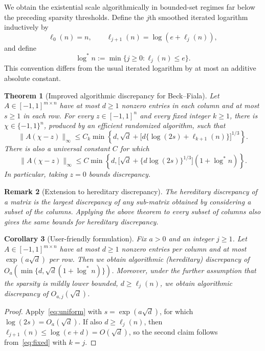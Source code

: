 \documentclass[reqno]{amsart}
\newtheorem{theorem}{Theorem}[section]
\newtheorem{corollary}[theorem]{Corollary}
\newtheorem{remark}[theorem]{Remark}
\theoremstyle{definition}
\newcommand{\norm}[1]{\lVert#1\rVert}
\newcommand{\lstar}{\log^*}
\begin{document}
We obtain the existential scale algorithmically in bounded-set regimes far below the preceding sparsity thresholds. Define the $j$th smoothed iterated logarithm inductively by
\begin{equation}\label{eq:logs} \ell_0(n)=n, \qquad \ell_{j+1}(n)=\log(e+\ell_j(n)), \end{equation}
and define
\[ \lstar n:=\min\{j\ge0:\ell_j(n)\le e\}. \]
This convention differs from the usual iterated logarithm by at most an additive absolute constant.

\begin{theorem}[Improved algorithmic discrepancy for Beck--Fiala]\label{thm:main}
Let $A\in[-1,1]^{m\times n}$ have at most $d\ge1$ nonzero entries in each column and at most $s\ge1$ in each row.  For every $z\in[-1,1]^n$ and every fixed integer $k\ge1$, there is $\chi\in\{-1,1\}^n$, produced by an efficient randomized algorithm, such that
\begin{equation}\label{eq:fixed} \norm{A(\chi-z)}_\infty \le C_k\min\!\left\{d,\sqrt d+ \bigl[d\{\log(2s)+\ell_{k+1}(n)\}\bigr]^{1/3}\right\}. \end{equation}
There is also a universal constant $C$ for which
\begin{equation}\label{eq:uniform} \norm{A(\chi-z)}_\infty \le C\min\!\left\{d, \bigl[\sqrt d+\{d\log(2s)\}^{1/3}\bigr](1+\lstar n)\right\}. \end{equation}
In particular, taking $z=0$ bounds discrepancy.
\end{theorem}


\begin{remark}[Extension to hereditary discrepancy]
The \textit{hereditary discrepancy} of a matrix is the largest discrepancy of any sub-matrix obtained by considering a subset of the columns. Applying the above theorem to every subset of columns also gives the same bounds for hereditary discrepancy.
\end{remark}



\begin{corollary}[User-friendly formulation]\label{cor:sqrt}
Fix $a>0$ and an integer $j\ge1$. Let $A\in[-1,1]^{m\times n}$ have at most $d\ge1$ nonzero entries per column and at most $\exp(a\sqrt d)$ per row. Then we obtain algorithmic (hereditary) discrepancy of $O_a(\min\{d,\sqrt d(1+\lstar n)\})$. Moreover, under the further assumption that the sparsity is mildly lower bounded, $d\ge\ell_j(n)$, we obtain algorithmic discrepancy of $O_{a,j}(\sqrt d)$.
\end{corollary}
\begin{proof}
Apply~\eqref{eq:uniform} with $s=\exp(a\sqrt d)$, for which $\log(2s)=O_a(\sqrt d)$. If also $d\ge\ell_j(n)$, then $\ell_{j+1}(n)\le\log(e+d)=O(\sqrt d)$, so the second claim follows from~\eqref{eq:fixed} with $k=j$.
\end{proof}
\end{document}
